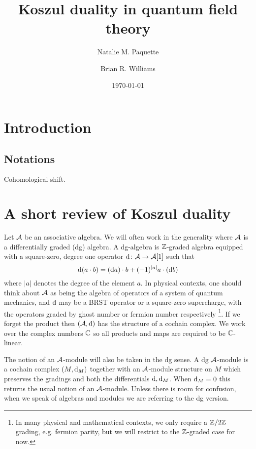 \documentclass[11pt]{amsart}
\author{Natalie M. Paquette}
\author{Brian R. Williams}
\date{\today}
\title{Koszul duality in quantum field theory}
\begin{document}
\maketitle

\begin{abstract}

\end{abstract}


\section{Introduction}

\subsection*{Notations}

Cohomological shift. 



\section{A short review of Koszul duality} 


Let $\mathcal A$ be an associative algebra.
We will often work in the generality where $\mathcal A$ is a differentially graded (dg) algebra. A dg-algebra is $\mathbb Z$-graded algebra equipped with a square-zero, degree one operator ${\rm d} \colon \mathcal A \to \mathcal A[1]$ such that 
\[
{\rm d} (a \cdot b) = ({\rm d} a) \cdot b + (-1)^{|a|} a \cdot ({\rm d} b) 
\]
where $|a|$ denotes the degree of the element $a$. In physical contexts, one should think about $\mathcal A$ as being the algebra of operators of a system of quantum mechanics, and ${\rm d}$ may be a BRST operator or a square-zero supercharge, with the operators graded by ghost number or fermion number respectively \footnote{In many physical and mathematical contexts, we only require a $\mathbb Z/2\mathbb Z$ grading, e.g. fermion parity, but we will restrict to the $\mathbb Z$-graded case for now.}.
If we forget the product then $(\mathcal A, {\rm d})$ has the structure of a cochain complex. 
We work over the complex numbers $\mathbb C$ so all products and maps are required to be $\mathbb C$-linear. 

The notion of an $\mathcal A$-module will also be taken in the dg sense. A dg $\mathcal A$-module is a cochain complex $(M, {\rm d}_M)$ together with an $\mathcal A$-module structure on $M$ which preserves the gradings and both the differentials ${\rm d}, {\rm d}_M$. 
When ${\rm d}_M = 0$ this returns the usual notion of an $\mathcal A$-module. 
Unless there is room for confusion, when we speak of algebras and modules we are referring to the dg version.
\end{document}
